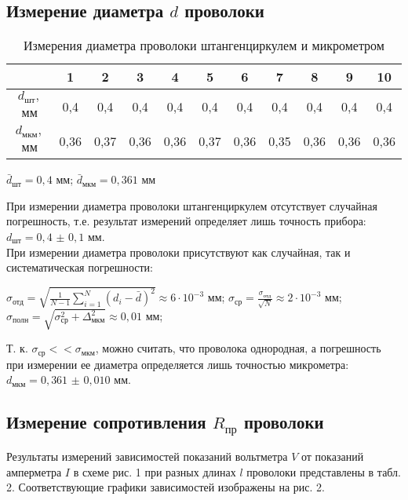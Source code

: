 \documentclass[a4paper]{article}
\begin{document}
\subsection{Измерение диаметра $d$ проволоки}
\vspace{-0.5cm}
\begin{table}[h]
\caption{Измерения диаметра проволоки штангенциркулем и микрометром}

\centering
\begin{tabular}{|c|c|c|c|c|c|c|c|c|c|c|}
\hline
& 1 & 2 & 3 & 4 & 5 & 6 & 7 & 8 & 9 & 10\\
\hline
$d_\text{шт},$ мм & 0,4 & 0,4 & 0,4 & 0,4 & 0,4 & 0,4 & 0,4 & 0,4 & 0,4 & 0,4\\
\hline
$d_\text{мкм},$ мм & 0,36 & 0,37 & 0,36 & 0,36 & 0,37 & 0,36 & 0,35 & 0,36 & 0,36 & 0,36\\
\hline
\end{tabular}
\end{table}
\centering
$\bar{d}_\text{шт} = 0,4$ мм; $\bar{d}_\text{мкм} = 0,361$ мм

\raggedright
При измерении диаметра проволоки штангенциркулем отсутствует случайная погрешность, т.е. результат измерений определяет лишь точность прибора:
$d_\text{шт} = 0,4$ $\pm$ $0,1$ мм. \\
При измерении диаметра проволоки присутствуют как случайная, так и систематическая погрешности:

\centering
 $ \sigma_\text{отд} = \sqrt{\frac{1}{N-1} \sum_{i=1}^{N} (d_i - \bar{d})^2} \approx   6 \cdot 10^{-3} $ мм;  
$\sigma_\text{ср} = \frac{\sigma_\text{отд}}{\sqrt{N}} \approx  2 \cdot 10^{-3} $ мм; 
$ \sigma_{\text{полн}} = \sqrt{\sigma_\text{ср}^2 + \Delta_\text{мкм}^2} \approx 0,01$ мм;

\raggedright
Т. к. $ \sigma_\text{ср} <<  \sigma_\text{мкм}$, можно считать, что проволока однородная,  а погрешность при измерении ее диаметра определяется лишь точностью микрометра: 
$d_\text{мкм} = 0,361$ $\pm$ $0,010$ мм. \\

\subsection{Измерение сопротивления $R_\text{пр}$ проволоки}

Результаты измерений зависимостей показаний вольтметра $V$ от показаний амперметра $I$ в
схеме рис. 1 при разных длинах $l$ проволоки представлены в табл. 2. Соответствующие графики
зависимостей изображены на рис. 2.
\end{document}
